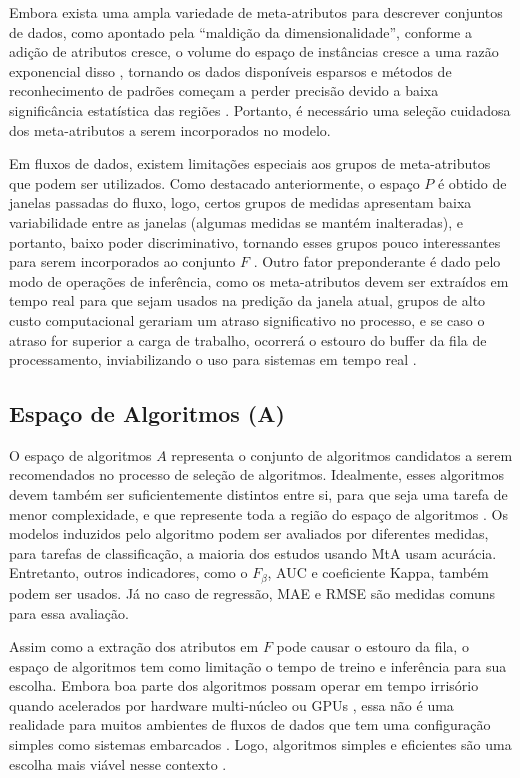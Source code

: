 Embora exista uma ampla variedade de meta-atributos para descrever conjuntos de dados, como apontado pela ``maldição da dimensionalidade'', conforme a adição de atributos cresce, o volume do espaço de instâncias cresce a uma razão exponencial disso \cite{goodfellow2016deep}, tornando os dados disponíveis esparsos e métodos de reconhecimento de padrões começam a perder precisão devido a baixa significância estatística das regiões \cite{bishop2006pattern}. Portanto, é necessário uma seleção cuidadosa dos meta-atributos a serem incorporados no modelo.

Em fluxos de dados, existem limitações especiais aos grupos de meta-atributos que podem ser utilizados. Como destacado anteriormente, o espaço $P$ é obtido de janelas passadas do fluxo, logo, certos grupos de medidas apresentam baixa variabilidade entre as janelas (algumas medidas se mantém inalteradas), e portanto, baixo poder discriminativo, tornando esses grupos pouco interessantes para serem incorporados ao conjunto $F$ \cite{Rivolli2018}. Outro fator preponderante é dado pelo modo de operações de inferência, como os meta-atributos devem ser extraídos em tempo real para que sejam usados na predição da janela atual, grupos de alto custo computacional gerariam um atraso significativo no processo, e se caso o atraso for superior a carga de trabalho, ocorrerá o estouro do buffer da fila de processamento, inviabilizando o uso para sistemas em tempo real \cite{gama2007learning}.

\subsection{Espaço de Algoritmos (A)}
O espaço de algoritmos $A$ representa o conjunto de algoritmos candidatos a
serem recomendados no processo de seleção de algoritmos.
Idealmente, esses algoritmos devem também ser suficientemente distintos entre
si, para que seja uma tarefa de menor complexidade, e que represente toda a região do espaço de algoritmos \cite{Munoz2018}.
Os modelos induzidos pelo algoritmo podem ser avaliados por diferentes medidas,
para tarefas de classificação, a maioria dos estudos usando MtA usam acurácia.
Entretanto, outros indicadores, como o $F_\beta$, AUC e coeficiente Kappa,
também podem ser usados. Já no caso de regressão, MAE e RMSE são medidas comuns para essa avaliação.

Assim como a extração dos atributos em $F$ pode causar o estouro da fila, o espaço de algoritmos tem como limitação o tempo de treino e inferência para sua escolha. Embora boa parte dos algoritmos possam operar em tempo irrisório quando acelerados por hardware multi-núcleo ou GPUs \cite{coleman2019analysis}, essa não é uma realidade para muitos ambientes de fluxos de dados que tem uma configuração simples como sistemas embarcados \cite{gama2007learning}. Logo, algoritmos simples e eficientes são uma escolha mais viável nesse contexto \cite{gama2007learning}.

